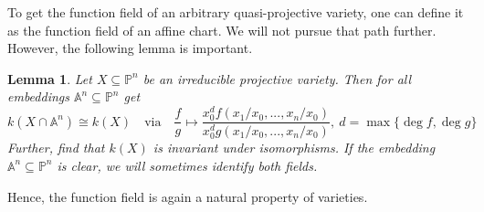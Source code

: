 \documentclass{scrartcl}
\newtheorem{lemma}[prop]{Lemma}
\theoremstyle{definition}
\begin{document}
To get the function field of an arbitrary quasi-projective variety, one can define it as the function field of an affine chart.
We will not pursue that path further.
However, the following lemma is important.
\begin{lemma}
    Let $X \subseteq \mathbb{P}^n$ be an irreducible projective variety. Then for all embeddings $\mathbb{A}^n \subseteq \mathbb{P}^n$ get
    \begin{equation*}
        k(X \cap \mathbb{A}^n) \cong k(X) \quad \text{via} \quad \frac f g \mapsto \frac {x_0^d f({x_1} / {x_0}, ..., {x_n} / {x_0})} {x_0^d g({x_1} / {x_0}, ..., {x_n} / {x_0})}, \ d = \max \{\deg f, \deg g\}
    \end{equation*}
    Further, find that $k(X)$ is invariant under isomorphisms.
    If the embedding $\mathbb{A}^n \subseteq \mathbb{P}^n$ is clear, we will sometimes identify both fields.
\end{lemma}
Hence, the function field is again a natural property of varieties.
\end{document}

